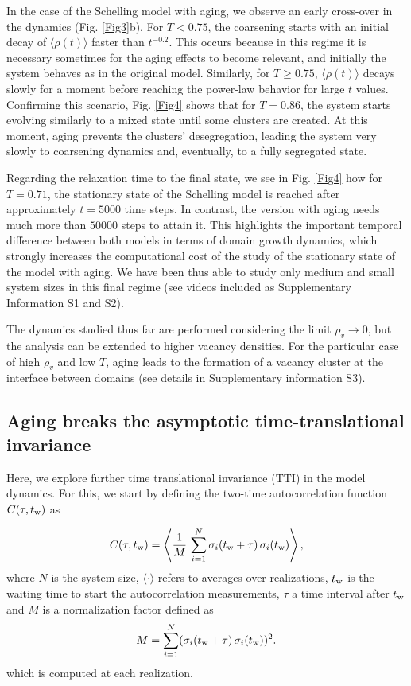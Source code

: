 In the case of the Schelling model with aging, we observe an early cross-over in the dynamics (Fig. \ref{Fig3}b). For $T < 0.75$, the coarsening starts with an initial decay of $\langle \rho (t)\rangle$ faster than $t^{-0.2}$. This occurs because in this regime it is necessary sometimes for the aging effects to become relevant, and initially the system behaves as in the original model. Similarly, for $T \ge 0.75$, $\langle \rho (t)\rangle$ decays slowly for a moment before reaching the power-law behavior for large $t$ values.  Confirming this scenario, Fig. \ref{Fig4} shows that for $T = 0.86$, the system starts evolving similarly to a mixed state until some clusters are created. At this moment, aging prevents the clusters' desegregation, leading the system very slowly to coarsening dynamics and, eventually, to a fully segregated state. 

Regarding the relaxation time to the final state, we see in Fig. \ref{Fig4} how for $T = 0.71$, the stationary state of the Schelling model is reached after approximately $t = 5000$ time steps. In contrast, the version with aging needs much more than $50000$ steps to attain it. This highlights the important temporal  difference between both models in terms of domain growth dynamics, which strongly increases the computational cost of the study of the stationary state of the model with aging. We have been thus able to study only medium and small system sizes in this final regime (see videos included as Supplementary Information S1 and S2).

The dynamics studied thus far are performed considering the limit $\rho_v \to 0$, but the analysis can be extended to higher vacancy densities. For the particular case of high $\rho_v$ and low $T$, aging leads to the formation of a vacancy cluster at the interface between domains (see details in Supplementary information S3).

\subsection{Aging breaks the asymptotic time-translational invariance}

Here, we explore further time translational invariance (TTI) in the model dynamics. For this, we start by defining the two-time autocorrelation function $C(\tau,t_{\rm{w}})$ \cite{spinglassbook} as

\begin{equation}
    C(\tau,t_{\rm{w}}) = \left\langle \frac{1}{M} \, \sum_{i = 1}^{N}  \sigma_i (t_{\rm{w}} + \tau) \,  \sigma_i(t_{\rm{w}}) \right\rangle ,
\end{equation}
where $N$ is the system size,  $\langle \cdot \rangle$ refers to averages over realizations, $t_{\rm{w}}$ is the waiting time to start the autocorrelation measurements, $\tau$ a time interval after $t_{\rm{w}}$ and $M$ is a normalization factor defined as
\begin{equation}
M =  \sum_{i = 1}^{N}  (\sigma_i (t_{\rm{w}} + \tau) \, \sigma_i(t_{\rm{w}}))^2 . 
\end{equation}
which is computed at each realization. 

